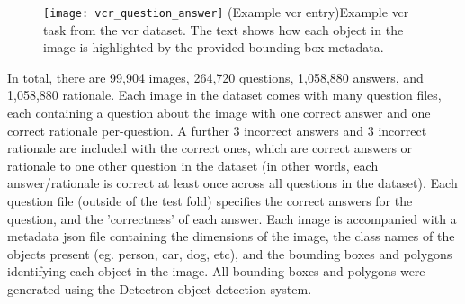 \begin{figure}[htbp]
    \centering
    \texttt{[image: vcr\_question\_answer]}
    \captionsource(Example \acrshort{vcr} entry){Example \acrshort{vcr} task from the \acrshort{vcr} dataset. The text shows how each object in the image is highlighted by the provided bounding box metadata. \label{fig:vcr_question_answer}}{\citeauthor{zellers_recognition_2019}\cite{zellers_recognition_2019}}
\end{figure}

In total, there are 99,904 images, 264,720 questions, 1,058,880 answers, and 1,058,880 rationale.
Each image in the dataset comes with many question files, each containing a question about the image with one correct answer and one correct rationale per-question.
A further 3 incorrect answers and 3 incorrect rationale are included with the correct ones, which are correct answers or rationale to one other question in the dataset (in other words, each answer/rationale is correct at least once across all questions in the dataset).
Each question file (outside of the test fold) specifies the correct answers for the question, and the 'correctness' of each answer.
Each image is accompanied with a metadata json file containing the dimensions of the image, the class names of the objects present (eg. person, car, dog, etc), and the bounding boxes and polygons identifying each object in the image.
All bounding boxes and polygons were generated using the Detectron object detection system\cite{Detectron2018}.

